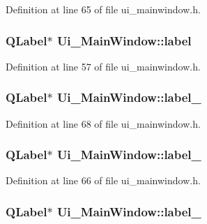 Definition at line 65 of file ui\_\-mainwindow.h.

\hypertarget{classUi__MainWindow_ad9c89133780f28e6efa2ec17ceb9cff5}{
\subsubsection[{label}]{\setlength{\rightskip}{0pt plus 5cm}QLabel$\ast$ {\bf Ui\_\-MainWindow::label}}}
\label{classUi__MainWindow_ad9c89133780f28e6efa2ec17ceb9cff5}


Definition at line 57 of file ui\_\-mainwindow.h.

\hypertarget{classUi__MainWindow_a9dc4dba26b83e0c94aa566e1c564420b}{
\subsubsection[{label\_\-10}]{\setlength{\rightskip}{0pt plus 5cm}QLabel$\ast$ {\bf Ui\_\-MainWindow::label\_}}}
\label{classUi__MainWindow_a9dc4dba26b83e0c94aa566e1c564420b}


Definition at line 68 of file ui\_\-mainwindow.h.

\hypertarget{classUi__MainWindow_a2e2516d755e4dd53fc905dabddf2738a}{
\subsubsection[{label\_\-2}]{\setlength{\rightskip}{0pt plus 5cm}QLabel$\ast$ {\bf Ui\_\-MainWindow::label\_}}}
\label{classUi__MainWindow_a2e2516d755e4dd53fc905dabddf2738a}


Definition at line 66 of file ui\_\-mainwindow.h.

\hypertarget{classUi__MainWindow_ad6bab8fb8903b8f41afea1218ee52695}{
\subsubsection[{label\_\-5}]{\setlength{\rightskip}{0pt plus 5cm}QLabel$\ast$ {\bf Ui\_\-MainWindow::label\_}}}
\label{classUi__MainWindow_ad6bab8fb8903b8f41afea1218ee52695}


